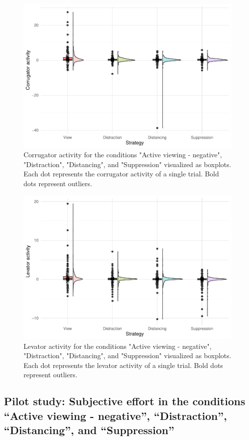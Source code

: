 \documentclass[
  man,floatsintext]{apa6}
\begin{document}
\begin{figure}[H]
\includegraphics[width=0.75\linewidth]{Manuscript_ERED_Stage2_files/figure-latex/FigEMGCorrRegPilot-1} \caption{Corrugator activity for the conditions "Active viewing - negative", "Distraction", "Distancing", and "Suppression" visualized as boxplots. Each dot represents the corrugator activity of a single trial. Bold dots represent outliers.}\label{fig:FigEMGCorrRegPilot}
\end{figure}

\begin{figure}[H]
\includegraphics[width=0.75\linewidth]{Manuscript_ERED_Stage2_files/figure-latex/FigEMGLevRegPilot-1} \caption{Levator activity for the conditions "Active viewing - negative", "Distraction", "Distancing", and "Suppression" visualized as boxplots. Each dot represents the levator activity of a single trial. Bold dots represent outliers.}\label{fig:FigEMGLevRegPilot}
\end{figure}

\hypertarget{pilot-study-subjective-effort-in-the-conditions-active-viewing---negative-distraction-distancing-and-suppression}{%
\subsection{Pilot study: Subjective effort in the conditions ``Active viewing - negative'', ``Distraction'', ``Distancing'', and ``Suppression''}\label{pilot-study-subjective-effort-in-the-conditions-active-viewing---negative-distraction-distancing-and-suppression}}
\end{document}

